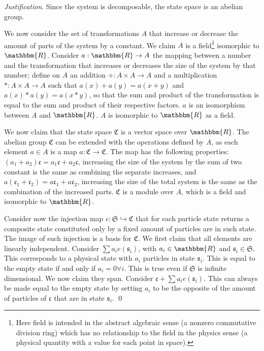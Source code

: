 \documentclass[aps,pra,10pt,twocolumn,floatfix,nofootinbib]{revtex4-1}
\theoremstyle{definition}
\newenvironment{justification}{\emph{Justification}.}{\qed}
\begin{document}
\begin{justification}
Since the system is decomposable, the state space is an abelian group.

We now consider the set of transformations $A$ that increase or decrease the amount of parts of the system by a constant. We claim $A$ is a field\footnote{Here field is intended in the abstract algebraic sense (a nonzero commutative division ring) which has no relationship to the field in the physics sense (a physical quantity with a value for each point in space).} isomorphic to $\mathbbm{R}$. Consider $a: \mathbbm{R} \rightarrow A$ the mapping between a number and the transformation that increases or decreases the size of the system by that number; define on $A$ an addition $+: A \times A \rightarrow A$ and a multiplication $*: A \times A \rightarrow A$ such that $a(x) + a(y) = a(x+y)$ and $a(x) * a(y) = a(x*y)$, so that the sum and product of the transformation is equal to the sum and product of their respective factors. $a$ is an isomorphism between $A$ and $\mathbbm{R}$. $A$ is isomorphic to $\mathbbm{R}$ as a field.

We now claim that the state space $\mathfrak{C}$ is a vector space over $\mathbbm{R}$. The abelian group $\mathfrak{C}$ can be extended with the operations defined by $A$, as each element $a \in A$ is a map $a : \mathfrak{C} \rightarrow \mathfrak{C}$. The map has the following properties: $(a_1 + a_2) \mathfrak{c} = a_1 \mathfrak{c} + a_2 \mathfrak{c}$, increasing the size of the system by the sum of two constant is the same as combining the separate increases, and $a (\mathfrak{c}_1 + \mathfrak{c}_2) = a \mathfrak{c}_1 + a \mathfrak{c}_2$, increasing the size of the total system is the same as the combination of the increased parts. $\mathfrak{C}$ is a module over $A$, which is a field and isomorphic to $\mathbbm{R}$.

Consider now the injection map $e: \mathfrak{S} \hookrightarrow \mathfrak{C}$ that for each particle state returns a composite state constituted only by a fixed amount of particles are in such state. The image of such injection is a basis for $\mathfrak{C}$. We first claim that all elements are linearly independent. Consider $\sum a_i e(\mathfrak{s}_i)$, with $a_i \in \mathbbm{R}$ and $\mathfrak{s}_i \in \mathfrak{S}$. This corresponds to a physical state with $a_i$ particles in state $\mathfrak{s}_i$. This is equal to the empty state if and only if $a_i=0 \forall i$. This is true even if $\mathfrak{S}$ is infinite dimensional. We now claim they span. Consider $\mathfrak{c} + \sum a_i e(\mathfrak{s}_i)$. This can always be made equal to the empty state by setting $a_i$ to be the opposite of the amount of particles of $\mathfrak{c}$ that are in state $\mathfrak{s}_i$.
\end{justification}
\end{document}
